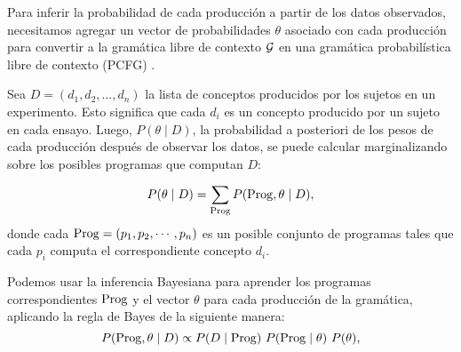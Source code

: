 Para inferir la probabilidad de cada producción a partir de los datos observados, necesitamos agregar un vector de probabilidades $\theta$ asociado con cada producción para convertir a la gramática libre de contexto $\gram$ en una gramática probabilística libre de contexto (PCFG) \cite{manning1999foundations}.


Sea $D = (d_1, d_2, \dots, d_n)$ la lista de conceptos producidos por los sujetos en un experimento. Esto significa que cada $d_i$ es un concepto producido por un sujeto en cada ensayo. Luego, $P(\theta \mid D)$, la probabilidad a posteriori de los pesos de cada producción después de observar los datos, se puede calcular marginalizando sobre los posibles programas que computan $D$:

%
\begin{equation}
\label{eqA}
P(\theta \mid D) = \sum_{\Prog} P(\Prog,\theta \mid D),
\end{equation} donde cada $\Prog  = (p_1, p_2, \cdots, p_n)$ es un posible conjunto de programas tales que cada $p_i$ computa el correspondiente concepto $d_i$.

Podemos usar la inferencia Bayesiana para aprender los programas correspondientes $\Prog$ y el vector $\theta$ para cada producción de la gramática, aplicando la regla de Bayes de la siguiente manera:
%
\begin{equation}
\label{eq:mainB}
P(\Prog,\theta \mid D) \propto P(D \mid \Prog)\ P(\Prog \mid \theta)\ P(\theta),
\end{equation}
%


